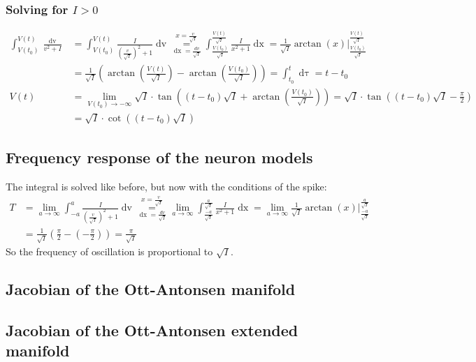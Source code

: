 \subsubsection{Solving for \texorpdfstring{$I > 0$}{TEXT}}
\begin{align*}
\int_{V(t_0)}^{V(t)} \frac{\mathop{dv}}{v^2 + I} &= \int_{V(t_0)}^{V(t)} \frac{I}{\left(\frac{v}{\sqrt{I}}\right)^2 + 1} \mathop{dv} 
\overset{x = \frac{v}{\sqrt{I}}}{\underset{\mathop{dx} = \frac{dv}{\sqrt{I}}}{=}} 
\int_{\frac{V(t_0)}{\sqrt{I}}}^{\frac{V(t)}{\sqrt{I}}} \frac{I}{x^2 + 1} \mathop{dx}= \frac{1}{\sqrt{I}} \arctan(x) \Big \rvert_{\frac{V(t_0)}{\sqrt{I}}}^{\frac{V(t)}{\sqrt{I}}} \\
&= \frac{1}{\sqrt{I}} \left( \arctan \left( \frac{V(t)}{\sqrt{I}} \right) - \arctan \left( \frac{V(t_0)}{\sqrt{I}} \right) \right) = 
\int_{t_0}^t \mathop{d\tau} = t - t_0 \\
V(t) &= \lim_{V(t_0) \rightarrow -\infty} \sqrt{I} \cdot \tan \left( (t - t_0) \sqrt{I} + \arctan \left( \frac{V(t_0)}{\sqrt{I}} \right) \right) = \sqrt{I} \cdot \tan \left( (t - t_0) \sqrt{I} - \frac{\pi}{2} \right) \\
&=  \sqrt{I} \cdot \cot \left( (t - t_0) \sqrt{I} \right) 
\end{align*}


\subsection{Frequency response of the neuron models} \label{app:ThetaModelFrequencyResponse}
The integral is solved like before, but now with the conditions of the spike:
\begin{align*}
T &= \lim_{a \rightarrow \infty} \int_{-a}^{a} \frac{I}{\left(\frac{v}{\sqrt{I}}\right)^2 + 1} \mathop{dv} 
\overset{x = \frac{v}{\sqrt{I}}}{\underset{\mathop{dx} = \frac{dv}{\sqrt{I}}}{=}} 
\lim_{a \rightarrow \infty} \int_{\frac{-a}{\sqrt{I}}}^{\frac{a}{\sqrt{I}}} \frac{I}{x^2 + 1} \mathop{dx}
= \lim_{a \rightarrow \infty} \frac{1}{\sqrt{I}} \arctan(x) \Big \rvert_{\frac{-a}{\sqrt{I}}}^{\frac{a}{\sqrt{I}}} \\
&= \frac{1}{\sqrt{I}} \left( \frac{\pi}{2} - \left( - \frac{\pi}{2} \right) \right)
= \frac{\pi}{\sqrt{I}}
\end{align*}
So the frequency of oscillation is proportional to $\sqrt{I}$. 

\subsection{Jacobian of the Ott-Antonsen manifold}
\subsection{Jacobian of the Ott-Antonsen extended manifold}







